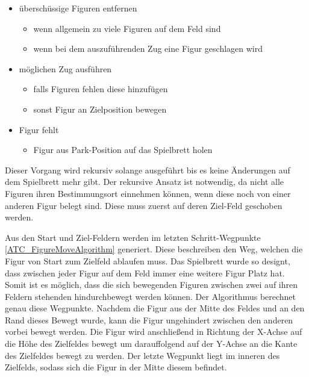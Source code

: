 \begin{itemize}
\tightlist
\item
  überschüssige Figuren entfernen

  \begin{itemize}
  \tightlist
  \item
    wenn allgemein zu viele Figuren auf dem Feld sind
  \item
    wenn bei dem auszuführenden Zug eine Figur geschlagen wird
  \end{itemize}
\item
  möglichen Zug ausführen

  \begin{itemize}
  \tightlist
  \item
    falls Figuren fehlen diese hinzufügen
  \item
    sonst Figur an Zielposition bewegen
  \end{itemize}
\item
  Figur fehlt

  \begin{itemize}
  \tightlist
  \item
    Figur aus Park-Position auf das Spielbrett holen
  \end{itemize}
\end{itemize}

Dieser Vorgang wird rekursiv solange ausgeführt bis es keine Änderungen
auf dem Spielbrett mehr gibt. Der rekursive Ansatz ist notwendig, da
nicht alle Figuren ihren Bestimmungsort einnehmen können, wenn diese
noch von einer anderen Figur belegt sind. Diese muss zuerst auf deren
Ziel-Feld geschoben werden.

Aus den Start und Ziel-Feldern werden im letzten Schritt-Wegpunkte
\ref{ATC_FigureMoveAlgorithm} generiert. Diese beschreiben den Weg,
welchen die Figur von Start zum Zielfeld ablaufen muss. Das Spielbrett
wurde so designt, dass zwischen jeder Figur auf dem Feld immer eine
weitere Figur Platz hat. Somit ist es möglich, dass die sich bewegenden
Figuren zwischen zwei auf ihren Feldern stehenden hindurchbewegt werden
können. Der Algorithmus berechnet genau diese Wegpunkte. Nachdem die
Figur aus der Mitte des Feldes und an den Rand dieses Bewegt wurde, kann
die Figur ungehindert zwischen den anderen vorbei bewegt werden. Die
Figur wird anschließend in Richtung der X-Achse auf die Höhe des
Zielfeldes bewegt um darauffolgend auf der Y-Achse an die Kante des
Zielfeldes bewegt zu werden. Der letzte Wegpunkt liegt im inneren des
Zielfelds, sodass sich die Figur in der Mitte diesem befindet.

